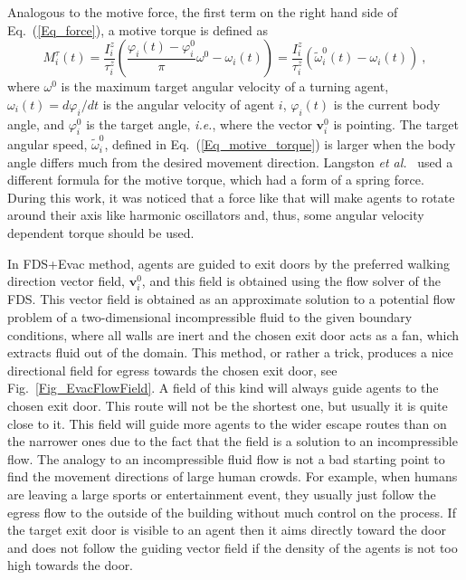 \documentclass[12pt,a4paper,final,twoside]{stylevk}
\begin{document}
Analogous to the motive force, the first term on the right hand
side of Eq.~(\ref{Eq_force}), a motive torque is defined as
%
\begin{equation}\label{Eq_motive_torque}
  {M}^{\tau}_{i}  (t) = \frac{ I^z_{i} }{ \tau^z_{i} } \left(
  \frac{ \varphi_i(t) - \varphi^0_{i} }{\pi} \omega^0 - \omega_i(t)
  \right) = \frac{ I^z_{i} }{ \tau^z_{i} } \left( \tilde \omega^0_i
  (t) -  \omega_i (t) \right) ~, 
\end{equation}
%
where $\omega^0 $ is the maximum target angular velocity of a turning
agent, $\omega_i (t) = d\varphi_i/dt$ is the angular velocity of agent
$i$, $\varphi_i(t)$ is the current body angle, and $\varphi^0_{i}$ is
the target angle, \emph{i.e.}, where the vector $ \mathbf{v}_i^0 $ is
pointing.  The target angular speed, $\tilde \omega^0_i$, defined in
Eq.~(\ref{Eq_motive_torque}) is larger when the body angle differs
much from the desired movement direction.  Langston {\em et
  al.}~\cite{Langston06} used a different formula for the motive
torque, which had a form of a spring force.  During this work, it was
noticed that a force like that will make agents to rotate around their
axis like harmonic oscillators and, thus, some angular velocity
dependent torque should be used.


In FDS+Evac method, agents are guided to exit doors by the preferred
walking direction vector field, $ \mathbf{v}_i^0$, and this field is
obtained using the flow solver of the FDS.  This vector field is
obtained as an approximate solution to a potential flow problem of a
two-dimensional incompressible fluid to the given boundary conditions,
where all walls are inert and the chosen exit door acts as a fan,
which extracts fluid out of the domain.  This method, or rather a
trick, produces a nice directional field for egress towards the chosen
exit door, see Fig.~\ref{Fig_EvacFlowField}.  A field of this kind
will always guide agents to the chosen exit door.  This route will not
be the shortest one, but usually it is quite close to it.  This field
will guide more agents to the wider escape routes than on the narrower
ones due to the fact that the field is a solution to an incompressible
flow.  The analogy to an incompressible fluid flow is not a bad
starting point to find the movement directions of large human crowds.
For example, when humans are leaving a large sports or entertainment
event, they usually just follow the egress flow to the outside of the
building without much control on the process.  If the target exit door
is visible to an agent then it aims directly toward the door and does
not follow the guiding vector field if the density of the agents is
not too high towards the door.
\end{document}
